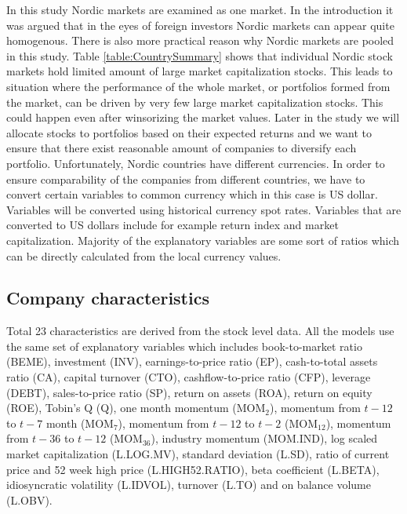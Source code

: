 \documentclass{article}
\begin{document}
In this study Nordic markets are examined as one market. In the introduction it was argued that in the eyes of foreign investors Nordic markets can appear quite homogenous. There is also more practical reason why Nordic markets are pooled in this study. Table \ref{table:CountrySummary} shows that individual Nordic stock markets hold limited amount of large market capitalization stocks. This leads to situation where the performance of the whole market, or portfolios formed from the market, can be driven by very few large market capitalization stocks. This could happen even after winsorizing the market values. Later in the study we will allocate stocks to portfolios based on their expected returns and we want to ensure that there exist reasonable amount of companies to diversify each portfolio. Unfortunately, Nordic countries have different currencies. In order to ensure comparability of the companies from different countries, we have to convert certain variables to common currency which in this case is US dollar. Variables will be converted using historical currency spot rates. Variables that are converted to US dollars include for example return index and market capitalization. Majority of the explanatory variables are some sort of ratios which can be directly calculated from the local currency values. \par

\subsection{Company characteristics}\label{CompanyCharacteristics}

Total 23 characteristics are derived from the stock level data. All the models use the same set of explanatory variables which includes book-to-market ratio (BEME), investment (INV), earnings-to-price ratio (EP), cash-to-total assets ratio (CA), capital turnover (CTO), cashflow-to-price ratio (CFP), leverage (DEBT), sales-to-price ratio (SP), return on assets (ROA), return on equity (ROE), Tobin's Q (Q), one month momentum (MOM$_2$), momentum from $t-12$ to $t-7$ month (MOM$_7$), momentum from $t-12$ to $t-2$ (MOM$_{12}$), momentum from $t-36$ to $t-12$ (MOM$_{36}$), industry momentum (MOM.IND), log scaled market capitalization (L.LOG.MV), standard deviation (L.SD), ratio of current price and 52 week high price (L.HIGH52.RATIO), beta coefficient (L.BETA), idiosyncratic volatility (L.IDVOL), turnover (L.TO) and on balance volume (L.OBV). \par
\end{document}

